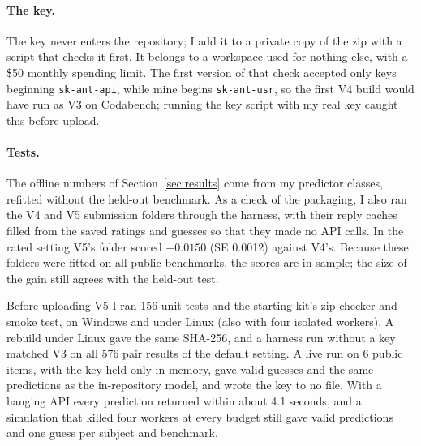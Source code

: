 \paragraph{The key.} The key never enters the repository; I add it to a private copy of the zip with a script that checks it first. It belongs to a workspace used for nothing else, with a \$50 monthly spending limit. The first version of that check accepted only keys beginning \texttt{sk-ant-api}, while mine begins \texttt{sk-ant-usr}, so the first V4 build would have run as V3 on Codabench; running the key script with my real key caught this before upload.

\paragraph{Tests.} The offline numbers of Section~\ref{sec:results} come from my predictor classes, refitted without the held-out benchmark. As a check of the packaging, I also ran the V4 and V5 submission folders through the harness, with their reply caches filled from the saved ratings and guesses so that they made no API calls. In the rated setting V5's folder scored $-0.0150$ (SE 0.0012) against V4's. Because these folders were fitted on all public benchmarks, the scores are in-sample; the size of the gain still agrees with the held-out test.

Before uploading V5 I ran 156 unit tests and the starting kit's zip checker and smoke test, on Windows and under Linux (also with four isolated workers). A rebuild under Linux gave the same SHA-256, and a harness run without a key matched V3 on all 576 pair results of the default setting. A live run on 6 public items, with the key held only in memory, gave valid guesses and the same predictions as the in-repository model, and wrote the key to no file. With a hanging API every prediction returned within about 4.1 seconds, and a simulation that killed four workers at every budget still gave valid predictions and one guess per subject and benchmark.
